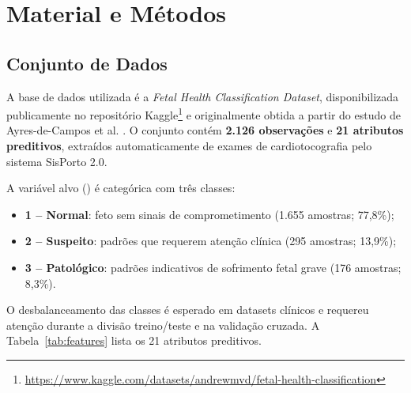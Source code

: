\documentclass[12pt, a4paper]{article}
\begin{document}
\section{Material e Métodos}
\label{sec:method}

\subsection{Conjunto de Dados}

A base de dados utilizada é a \textit{Fetal Health Classification Dataset}, disponibilizada
publicamente no repositório Kaggle\footnote{\url{https://www.kaggle.com/datasets/andrewmvd/fetal-health-classification}}
e originalmente obtida a partir do estudo de Ayres-de-Campos et al. \cite{campos2000}. O conjunto
contém \textbf{2.126 observações} e \textbf{21 atributos preditivos}, extraídos automaticamente
de exames de cardiotocografia pelo sistema SisPorto 2.0.

A variável alvo () é categórica com três classes:
\begin{itemize}
    \item \textbf{1 -- Normal}: feto sem sinais de comprometimento (1.655 amostras; 77{,}8\%);
    \item \textbf{2 -- Suspeito}: padrões que requerem atenção clínica (295 amostras; 13{,}9\%);
    \item \textbf{3 -- Patológico}: padrões indicativos de sofrimento fetal grave (176 amostras; 8{,}3\%).
\end{itemize}

O desbalanceamento das classes é esperado em datasets clínicos e requereu atenção durante a
divisão treino/teste e na validação cruzada. A Tabela~\ref{tab:features} lista os 21 atributos
preditivos.
\end{document}
